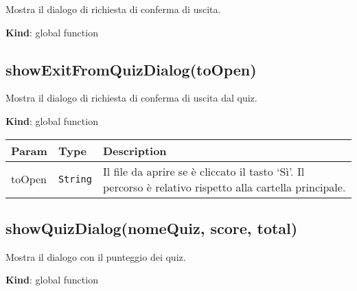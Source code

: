 Mostra il dialogo di richiesta di conferma di uscita.

\textbf{Kind}: global function\\
\protect\hypertarget{showExitFromQuizDialog}{}{}

\hypertarget{showexitfromquizdialogtoopen}{%
\subsection{showExitFromQuizDialog(toOpen)}\label{showexitfromquizdialogtoopen}}

Mostra il dialogo di richiesta di conferma di uscita dal quiz.

\textbf{Kind}: global function

\begin{tabularx}{\textwidth}{XXX}
\toprule
\begin{minipage}[b]{0.30\columnwidth}\raggedright
Param\strut
\end{minipage} & \begin{minipage}[b]{0.30\columnwidth}\raggedright
Type\strut
\end{minipage} & \begin{minipage}[b]{0.30\columnwidth}\raggedright
Description\strut
\end{minipage}\tabularnewline
\midrule
\endhead
\begin{minipage}[t]{0.30\columnwidth}\raggedright
toOpen\strut
\end{minipage} & \begin{minipage}[t]{0.30\columnwidth}\raggedright
\texttt{String}\strut
\end{minipage} & \begin{minipage}[t]{0.30\columnwidth}\raggedright
Il file da aprire se è cliccato il tasto `Sì'. Il percorso è relativo
rispetto alla cartella principale.\strut
\end{minipage}\tabularnewline
\bottomrule
\end{tabularx}

\protect\hypertarget{showQuizDialog}{}{}

\hypertarget{showquizdialognomequiz-score-total}{%
\subsection{showQuizDialog(nomeQuiz, score,
total)}\label{showquizdialognomequiz-score-total}}

Mostra il dialogo con il punteggio dei quiz.

\textbf{Kind}: global function

